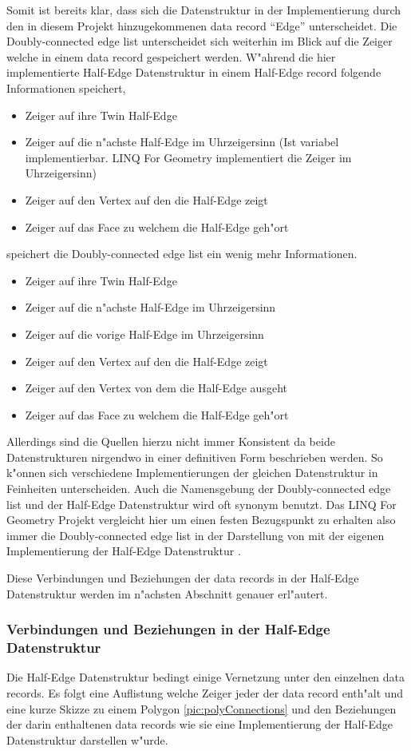 \documentclass[pagesize, paper=a4, fontsize=12pt,titlepage=true, headings=small, headnosepline, abstractoff, liststotoc, nochapterprefix, plainheadsepline]{scrreprt}
\newcommand{\LFGS}{LINQ For Geometry }
\newcommand{\HES}{Half-Edge Datenstruktur }
\begin{document}
Somit ist bereits klar, dass sich die Datenstruktur in der Implementierung durch den in diesem Projekt hinzugekommenen data record "`Edge"' unterscheidet. Die Doubly-connected edge list unterscheidet sich weiterhin im Blick auf die Zeiger welche in einem data record gespeichert werden. W"ahrend die hier implementierte \HES in einem Half-Edge record folgende Informationen speichert,
\begin{itemize}
\item Zeiger auf ihre Twin Half-Edge
\item Zeiger auf die n"achste Half-Edge im Uhrzeigersinn (Ist variabel implementierbar. \LFGS implementiert die Zeiger im Uhrzeigersinn)
\item Zeiger auf den Vertex auf den die Half-Edge zeigt
\item Zeiger auf das Face zu welchem die Half-Edge geh"ort
\end{itemize}

speichert die Doubly-connected edge list ein wenig mehr Informationen.
\begin{itemize}
\item Zeiger auf ihre Twin Half-Edge
\item Zeiger auf die n"achste Half-Edge im Uhrzeigersinn
\item Zeiger auf die vorige Half-Edge im Uhrzeigersinn
\item Zeiger auf den Vertex auf den die Half-Edge zeigt
\item Zeiger auf den Vertex von dem die Half-Edge ausgeht
\item Zeiger auf das Face zu welchem die Half-Edge geh"ort
\end{itemize}

Allerdings sind die Quellen hierzu nicht immer Konsistent da beide Datenstrukturen nirgendwo in einer definitiven Form beschrieben werden. So k"onnen sich verschiedene Implementierungen der gleichen Datenstruktur in Feinheiten unterscheiden. Auch die Namensgebung der Doubly-connected edge list und der \HES wird oft synonym benutzt. Das \LFGS Projekt vergleicht hier um einen festen Bezugspunkt zu erhalten also immer die Doubly-connected edge list in der Darstellung von \cite[S.~30 und Folgende]{vanMarkdeBerg.2008} mit der eigenen Implementierung der \HES.

Diese Verbindungen und Beziehungen der data records in der \HES werden im n"achsten Abschnitt genauer erl"autert.

			\subsubsection {Verbindungen und Beziehungen in der \HES}
				Die \HES bedingt einige Vernetzung unter den einzelnen data records. Es folgt eine Auflistung welche Zeiger jeder der data record enth"alt und eine kurze Skizze zu einem Polygon \ref{pic:polyConnections} und den Beziehungen der darin enthaltenen data records wie sie eine Implementierung der \HES darstellen w"urde.
\end{document}
